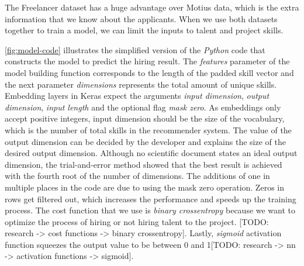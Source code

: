 The Freelancer dataset has a huge advantage over Motius data, which is the extra information that we know about the applicants. When we use both datasets together to train a model, we can limit the inputs to talent and project skills. 

\autoref{fig:model-code} illustrates the simplified version of the \textit{Python} code that constructs the model to predict the hiring result. The \textit{features} parameter of the model building function corresponds to the length of the padded skill vector and the next parameter \textit{dimensions} represents the total amount of unique skills. Embedding layers in Keras expect the arguments \textit{input dimension}, \textit{output dimension}, \textit{input length} and the optional flag \textit{mask zero}. As embeddings only accept positive integers, input dimension should be the size of the vocabulary, which is the number of total skills in the recommender system. The value of the output dimension can be decided by the developer and explains the size of the desired output dimension. Although no scientific document states an ideal output dimension, the trial-and-error method showed that the best result is achieved with the fourth root of the number of dimensions. The additions of one in multiple places in the code are due to using the mask zero operation. Zeros in rows get filtered out, which increases the performance and speeds up the training process. The cost function that we use is \textit{binary crossentropy} because we want to optimize the process of hiring or not hiring talent to the project. [TODO: research -> cost functions -> binary crossentropy]. Lastly, \textit{sigmoid} activation function squeezes the output value to be between 0 and 1[TODO: research -> nn -> activation functions -> sigmoid].



